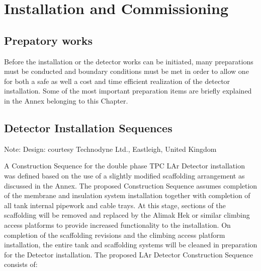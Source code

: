 \section{Installation and Commissioning}
\label{sec:detectors-fd-alt-install}

\subsection{Prepatory works}

Before the installation or the detector works can be initiated, many preparations must be conducted and boundary conditions must be met in order to allow one for both a safe as well a cost and time efficient realization of the detector installation.  Some of the most important preparation items are briefly explained in the Annex belonging to this Chapter.

\subsection{Detector Installation Sequences}
Note: Design: courtesy Technodyne Ltd., Eastleigh, United Kingdom

A Construction Sequence for the double phase TPC LAr Detector installation was defined based on the use of a slightly modified scaffolding arrangement as discussed in the Annex.  The proposed Construction Sequence assumes completion of the membrane and insulation system installation together with completion of all tank internal pipework and cable trays.  At this stage, sections of the scaffolding will be removed and replaced by the Alimak Hek or similar climbing access platforms to provide increased functionality to the installation.  On completion of the scaffolding revisions and the climbing access platform installation, the entire tank and scaffolding systems will be cleaned in preparation for the Detector installation.  The proposed LAr Detector Construction Sequence consists of:

